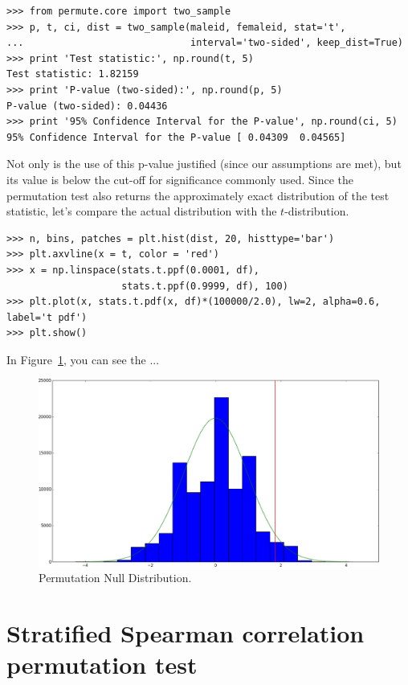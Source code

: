 \begin{verbatim}
>>> from permute.core import two_sample
>>> p, t, ci, dist = two_sample(maleid, femaleid, stat='t',
...                             interval='two-sided', keep_dist=True)
>>> print 'Test statistic:', np.round(t, 5)
Test statistic: 1.82159
>>> print 'P-value (two-sided):', np.round(p, 5)
P-value (two-sided): 0.04436
>>> print '95% Confidence Interval for the P-value', np.round(ci, 5)
95% Confidence Interval for the P-value [ 0.04309  0.04565]
\end{verbatim}

Not only is the use of this p-value justified (since our assumptions are
met), but its value is below the cut-off for significance commonly used.
Since the permutation test also returns the approximately exact distribution
of the test statistic, let's compare the actual distribution with the
$t$-distribution.

\begin{verbatim}
>>> n, bins, patches = plt.hist(dist, 20, histtype='bar')
>>> plt.axvline(x = t, color = 'red')
>>> x = np.linspace(stats.t.ppf(0.0001, df),
                    stats.t.ppf(0.9999, df), 100)
>>> plt.plot(x, stats.t.pdf(x, df)*(100000/2.0), lw=2, alpha=0.6, label='t pdf')
>>> plt.show()
\end{verbatim}

In Figure~\ref{fig:figure1}, you can see the ...

\begin{figure}
  \begin{centering}
    \includegraphics[width=.8\textwidth]{fig/figure_1.png}\par
  \end{centering}

  \caption{\label{fig:figure1}Permutation Null Distribution.}

\end{figure}

\section{Stratified Spearman correlation permutation test}

